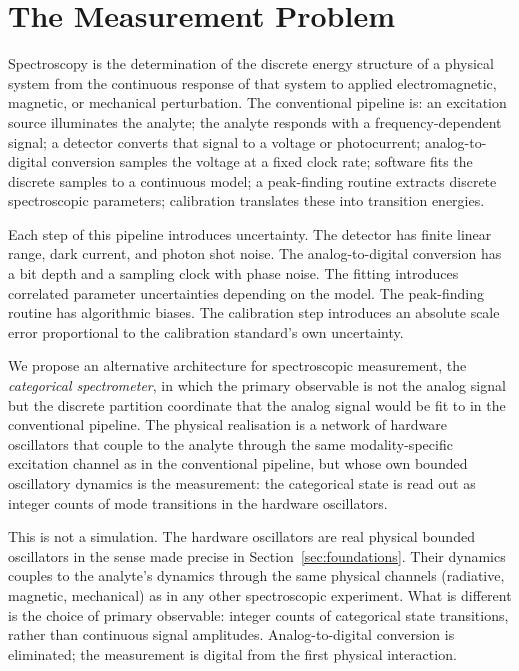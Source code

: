 \documentclass[twocolumn,11pt,a4paper]{article}
\theoremstyle{thmstyle}
\theoremstyle{axiomstyle}
\theoremstyle{definition}
\theoremstyle{remark}
\begin{document}
\section{The Measurement Problem}
\label{sec:intro}

Spectroscopy is the determination of the discrete energy structure of a physical system from the continuous response of that system to applied electromagnetic, magnetic, or mechanical perturbation. The conventional pipeline is: an excitation source illuminates the analyte; the analyte responds with a frequency-dependent signal; a detector converts that signal to a voltage or photocurrent; analog-to-digital conversion samples the voltage at a fixed clock rate; software fits the discrete samples to a continuous model; a peak-finding routine extracts discrete spectroscopic parameters; calibration translates these into transition energies.

Each step of this pipeline introduces uncertainty. The detector has finite linear range, dark current, and photon shot noise. The analog-to-digital conversion has a bit depth and a sampling clock with phase noise. The fitting introduces correlated parameter uncertainties depending on the model. The peak-finding routine has algorithmic biases. The calibration step introduces an absolute scale error proportional to the calibration standard's own uncertainty.

We propose an alternative architecture for spectroscopic measurement, the \emph{categorical spectrometer}, in which the primary observable is not the analog signal but the discrete partition coordinate that the analog signal would be fit to in the conventional pipeline. The physical realisation is a network of hardware oscillators that couple to the analyte through the same modality-specific excitation channel as in the conventional pipeline, but whose own bounded oscillatory dynamics is the measurement: the categorical state is read out as integer counts of mode transitions in the hardware oscillators.

This is not a simulation. The hardware oscillators are real physical bounded oscillators in the sense made precise in Section~\ref{sec:foundations}. Their dynamics couples to the analyte's dynamics through the same physical channels (radiative, magnetic, mechanical) as in any other spectroscopic experiment. What is different is the choice of primary observable: integer counts of categorical state transitions, rather than continuous signal amplitudes. Analog-to-digital conversion is eliminated; the measurement is digital from the first physical interaction.
\end{document}
